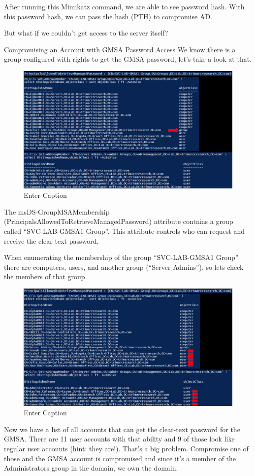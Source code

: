 After running this Mimikatz command, we are able to see password hash. With this password hash, we can pass the hash (PTH) to compromise AD.

But what if we couldn’t get access to the server itself?

Compromising an Account with GMSA Password Access
We know there is a group configured with rights to get the GMSA password, let’s take a look at that.

\begin{figure}
    \centering
    \includegraphics[width=0.75\linewidth]{msdsgrp.png}
    \caption{Enter Caption}
    \label{fig:placeholder}
\end{figure}

The msDS-GroupMSAMembership (PrincipalsAllowedToRetrieveManagedPassword) attribute contains a group called “SVC-LAB-GMSA1 Group”. This attribute controls who can request and receive the clear-text password.

When enumerating the membership of the group “SVC-LAB-GMSA1 Group” there are computers, users, and another group (“Server Admins”), so lets check the members of that group.

\begin{figure}
    \centering
    \includegraphics[width=0.75\linewidth]{gsma.png}
    \caption{Enter Caption}
    \label{fig:placeholder}
\end{figure}

Now we have a list of all accounts that can get the clear-text password for the GMSA. There are 11 user accounts with that ability and 9 of those look like regular user accounts (hint: they are!). That’s a big problem.
Compromise one of those and the GMSA account is compromised and since it’s a member of the Administrators group in the domain, we own the domain.

